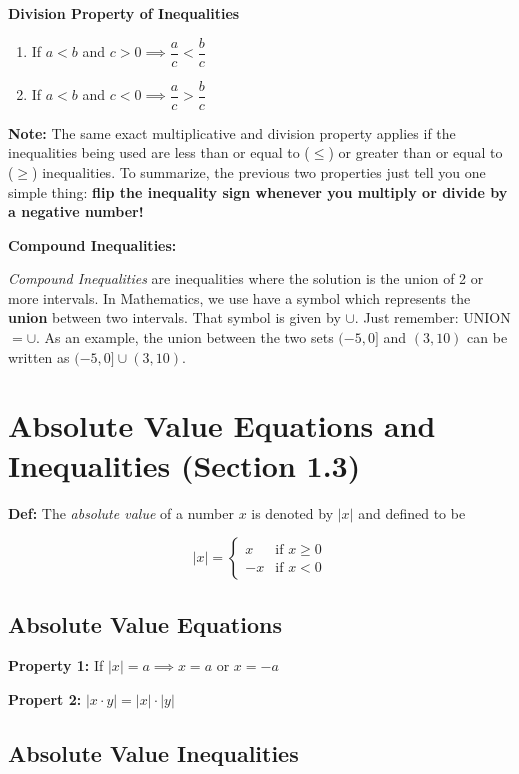 \documentclass[12pt]{article}
\begin{document}
\newpage

\textbf{Division Property of Inequalities}

\begin{enumerate}

\item If $a < b$ and $c > 0 \implies \dfrac{a}{c} < \dfrac{b}{c}$ 
\item If $a < b$ and $c < 0 \implies \dfrac{a}{c} > \dfrac{b}{c}$

\end{enumerate}

\textbf{Note:} The same exact multiplicative and division property applies if the inequalities being used are less than or equal to ($\leq$) or greater than or equal to ($\geq$) inequalities. To summarize, the previous two properties just tell you one simple thing: \textbf{flip the inequality sign whenever you multiply or divide by a negative number!}

\textbf{Compound Inequalities:}

\textit{Compound Inequalities} are inequalities where the solution is the union of 2 or more intervals. In Mathematics, we use have a symbol which represents the \textbf{union} between two intervals. That symbol is given by $\cup$. Just remember: UNION $ = \cup$. As an example, the union between the two sets $(-5, 0]$ and $(3, 10)$ can be written as $(-5,0] \cup (3, 10)$.

\section{Absolute Value Equations and Inequalities (Section 1.3)}


\textbf{Def:} The \textit{absolute value} of a number $x$ is denoted by $|x|$ and defined to be 

\abovedisplayskip=0pt\relax
\[
\lvert x \rvert =
\begin{cases}
x & \text{if } x \geq0\\
-x& \text{if } x<0
\end{cases}
\]

\subsection{Absolute Value Equations}

\textbf{Property 1:} If $|x| = a \implies x = a$ or $x = -a$

\textbf{Propert 2:} $|x \cdot y| = |x| \cdot |y|$

\subsection{Absolute Value Inequalities}
\end{document}
